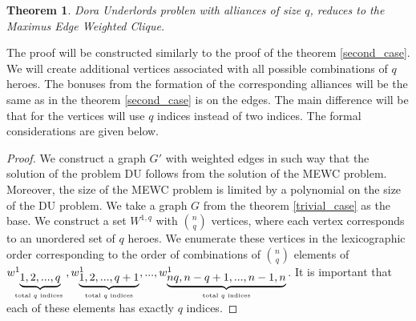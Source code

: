 \documentclass{article}
\newtheorem{theorem}{Theorem}
\begin{document}
\begin{theorem}
\label{general_case}
    Dora Underlords problen with alliances of size $q$, reduces to the Maximus Edge Weighted Clique.
\end{theorem}
	The proof will be constructed similarly to the proof of the theorem \ref {second_case}.
We will create additional vertices associated with all possible combinations of $q$ heroes. The bonuses from the formation of the corresponding alliances will be the same as in the theorem \ref {second_case} is on the edges.
The main difference will be that for the vertices will use $q$ indices instead of two indices. The formal considerations are given below.
\begin{proof}
    
We construct a graph $G'$ with weighted edges in such way that the solution of the problem DU follows from the solution of the MEWC problem. Moreover, the size of the MEWC problem is limited by a polynomial on the size of the DU problem.
    We take a graph $G$ from the theorem \ref{trivial_case} as the base. We construct a set $W^{1,q} $ with $\binom{n}{q} $ vertices, where each vertex corresponds to an unordered set of $q$ heroes. We enumerate these vertices in the lexicographic order corresponding to the order of  combinations of $ \binom {n}{q} $ elements of $ w^1_ {\underbrace {1,2, ..., q}_\text{total $ q $ indices }}, w^1_{\underbrace {1,2, ..., q + 1}_\text {total $ q $ indices}}, ..., w^1_ {\underbrace{nq, n-q+1, ..., n-1, n}_\text{total $ q $ indices}} $. It is important that each of these elements has exactly $q$ indices.


\end{proof}
\end{document}
